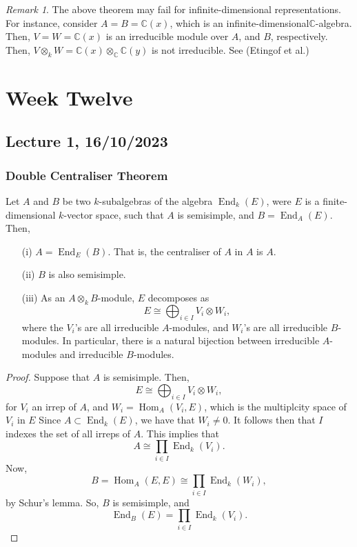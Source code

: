 \documentclass[a4paper]{report}
\theoremstyle{definition}
\theoremstyle{remark}
\newtheorem{remark}{Remark}
\theoremstyle{proposition}
\theoremstyle{conjecture}
\theoremstyle{lemma}
\theoremstyle{corollary}
\theoremstyle{exercise}
\theoremstyle{example}
\newcommand{\C}{\mathbb{C}}
\newcommand{\on}{\operatorname}
\begin{document}
\begin{remark}
    The above theorem may fail for infinite-dimensional representations.
    For instance, consider $A = B = \C(x)$, which is an 
    infinite-dimensional$\C$-algebra.
    Then, $V=W= \C(x)$ is an irreducible module over $A$, and $B$, 
    respectively.
    Then, $V\otimes_kW = \C(x) \otimes_\C \C(y)$ 
    is not irreducible. See (Etingof et al.)
\end{remark}


\chapter{Week Twelve}

\section{Lecture 1, 16/10/2023}

\subsection{Double Centraliser Theorem}

\begin{theorem}
    Let $A$ and $B$ be two $k$-subalgebras of the algebra $\on{End}_k(E)$,
    were $E$ is a finite-dimensional $k$-vector space, such that 
    $A$ is semisimple, and $B = \on{End}_A(E)$.
    Then,
    \begin{itemize}
        \item[(i)] $A = \on{End}_E(B)$. That is, the centraliser of $A$ in $A$ is $A$.
        \item[(ii)] $B$ is also semisimple.
        \item[(iii)] As an $A\otimes_kB$-module, $E$ decomposes 
            as $$E \cong \bigoplus_{i\in I} V_i\otimes W_i,$$
            where the $V_i$'s are all irreducible $A$-modules,
            and $W_i$'s are all irreducible $B$-modules.
            In particular, there is a natural bijection
            between irreducible $A$-modules and irreducible $B$-modules.
    \end{itemize}
\end{theorem}

\begin{proof}
    Suppose that $A$ is semisimple. Then, 
    $$E \cong \bigoplus_{i\in I} V_i \otimes W_i,$$ 
    for $V_i$ an irrep of $A$, and $W_i = \on{Hom}_A(V_i,E)$, which 
    is the multiplcity space of $V_i$ in $E$
    Since $A \subset \on{End}_k(E)$, we have that 
    $W_i \neq 0$. It follows then that $I$ indexes the set of all 
    irreps of $A$. This implies that 
    $$A \cong \prod_{i \in I} \on{End}_k(V_i).$$
    Now, $$B = \on{Hom}_A(E,E) \cong \prod_{i\in I} \on{End}_k(W_i),$$
    by Schur's lemma. So, $B$ is semisimple, and
    $$\on{End}_B(E) = \prod_{i\in I}\on{End}_k(V_i).$$ 
\end{proof}
\end{document}
